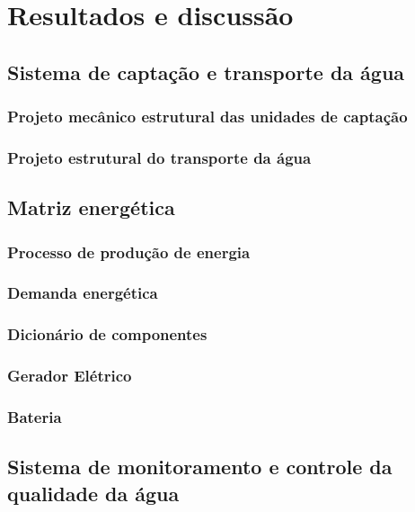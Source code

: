 \chapter[Resultados]{Resultados e discussão}
 
  \section{Sistema de captação e transporte da água}
  
    \subsection{Projeto mecânico estrutural das unidades de captação}
   
    
    \subsection{Projeto estrutural do transporte da água}
    
  \section{Matriz energética}
  	\subsection{Processo de produção de energia}
  		
  	\subsection{Demanda energética}
  		
  	\subsection{Dicionário de componentes}
  		
  	\subsection{Gerador Elétrico}
  		
  	\subsection{Bateria}
  		
    
  \section{Sistema de monitoramento e controle da qualidade da água}
    
